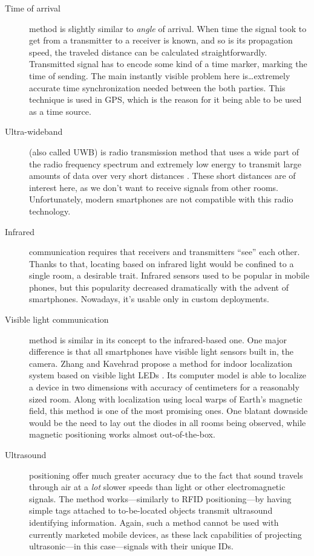 \begin{description}
	\item[Time of arrival] method is slightly similar to \emph{angle} of arrival. When time the signal took to get from a transmitter to a receiver is known, and so is its propagation speed, the traveled distance can be calculated straightforwardly. Transmitted signal has to encode some kind of a time marker, marking the time of sending. The main instantly visible problem here is\ldots extremely accurate time synchronization needed between the both parties. This technique is used in GPS, which is the reason for it being able to be used as a time source.
	
	\item[Ultra-wideband] (also called UWB) is radio transmission method that uses a wide part of the radio frequency spectrum and extremely low energy to transmit large amounts of data over very short distances \cite{ultra-wideband}. These short distances are of interest here, as we don't want to receive signals from other rooms. Unfortunately, modern smartphones are not compatible with this radio technology.
	
	\item[Infrared] communication requires that receivers and transmitters ``see'' each other. Thanks to that, locating based on infrared light would be confined to a single room, a desirable trait. Infrared sensors used to be popular in mobile phones, but this popularity decreased dramatically with the advent of smartphones. Nowadays, it's usable only in custom deployments.
	
	\item[Visible light communication] method is similar in its concept to the infrared-based one. One major difference is that all smartphones have visible light sensors built in, the camera. Zhang and Kavehrad propose a method for indoor localization system based on visible light LEDs \cite{Zhang:visible-light}. Its computer model is able to localize a device in two dimensions with accuracy of centimeters for a reasonably sized room. Along with localization using local warps of Earth's magnetic field, this method is one of the most promising ones. One blatant downside would be the need to lay out the diodes in all rooms being observed, while magnetic positioning works almost out-of-the-box.
	
	\item[Ultrasound] positioning offer much greater accuracy due to the fact that sound travels through air at a \emph{lot} slower speeds than light or other electromagnetic signals. The method works---similarly to RFID positioning---by having simple tags attached to to-be-located objects transmit ultrasound identifying information. Again, such a method cannot be used with currently marketed mobile devices, as these lack capabilities of projecting ultrasonic---in this case---signals with their unique IDs.
	

\end{description}
